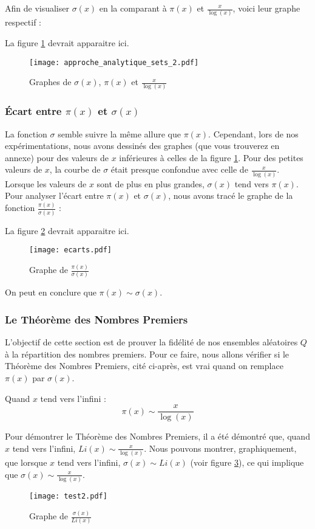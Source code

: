 \documentclass[../main.tex]{report}
\begin{document}
Afin de visualiser  $\sigma(x)$ en la comparant à $\pi(x)$ et $\frac{x}{\log(x)}$, voici leur graphe respectif : 

\hspace{1cm}

La figure \ref{im:image1} devrait apparaitre ici.
\begin{figure}[htbp]
	\centerline{\texttt{[image: approche\_analytique\_sets\_2.pdf]}}
\caption{Graphes de $\sigma(x)$, $\pi(x)$ et $\frac{x}{\log(x)}$ }
	\label{im:image1}
\end{figure}

\subsubsection{Écart entre $\pi(x)$ et $\sigma(x)$}

La fonction $\sigma$ semble suivre la même allure que $\pi(x)$. Cependant, lors de nos expérimentations, nous avons
dessinés des graphes (que vous trouverez en annexe) pour des valeurs de $x$ inférieures à celles de la figure \ref{im:image1}. Pour des petites valeurs de $x$, la courbe de $\sigma$ était presque confondue avec celle de $\frac{x}{\log(x)}$. Lorsque les valeurs de $x$ sont de plus en plus grandes, $\sigma(x)$ tend vers $\pi(x)$. Pour analyser l'écart entre $\pi(x)$ et $\sigma(x)$, nous avons tracé le graphe de la fonction $\frac{\pi(x)}{\sigma(x)}$ : 

\hspace{1cm}

La figure \ref{im:image2} devrait apparaitre ici.
\begin{figure}[htbp]
	\centerline{\texttt{[image: ecarts.pdf]}}
\caption{Graphe de $\frac{\pi(x)}{\sigma(x)}$ }
	\label{im:image2}
\end{figure}
On peut en conclure que $ \pi(x) \sim \sigma(x) $.


\subsubsection{Le Théorème des Nombres Premiers}

L'objectif de cette section est de prouver la fidélité de nos ensembles aléatoires $Q$ à la répartition des nombres premiers.
Pour ce faire, nous allons vérifier si le Théorème des Nombres Premiers, cité ci-après, est vrai quand on remplace $\pi(x)$ par $\sigma(x)$. 

\begin{Thm}
\label{TNP}
	Quand $x$ tend vers l'infini : 
	\[ \pi(x) \sim \frac{x}{\log(x)}  \]
\end{Thm}

Pour démontrer le Théorème des Nombres Premiers, il a été démontré que, quand $x$ tend vers l'infini, $ Li(x) \sim \frac{x}{\log(x)} $. Nous pouvons montrer, graphiquement, que lorsque $x$ tend vers l'infini, $ \sigma(x) \sim Li(x) $ (voir figure \ref{im:image3}), ce qui implique que $ \sigma(x) \sim \frac{x}{\log(x)} $.
\begin{figure}[htbp]
	\centerline{\texttt{[image: test2.pdf]}}
\caption{Graphe de $\frac{\sigma(x)}{Li(x)}$ }
	\label{im:image3}
\end{figure}
\end{document}
